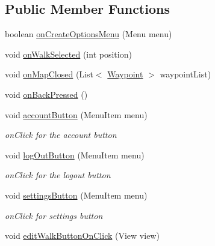 \subsection*{Public Member Functions}
\begin{DoxyCompactItemize}
\item 
boolean \hyperlink{classuk_1_1ac_1_1swan_1_1digitaltrails_1_1activities_1_1_my_walks_activity_ad0a1535fb7502d3954c565413a9d6e63}{on\+Create\+Options\+Menu} (Menu menu)
\item 
void \hyperlink{classuk_1_1ac_1_1swan_1_1digitaltrails_1_1activities_1_1_my_walks_activity_a5b28704bc8895e34d1130c06549bd003}{on\+Walk\+Selected} (int position)
\item 
void \hyperlink{classuk_1_1ac_1_1swan_1_1digitaltrails_1_1activities_1_1_my_walks_activity_a9fb92abb2b5dc3417c1008a7b98c2334}{on\+Map\+Closed} (List$<$ \hyperlink{classuk_1_1ac_1_1swan_1_1digitaltrails_1_1components_1_1_waypoint}{Waypoint} $>$ waypoint\+List)
\item 
void \hyperlink{classuk_1_1ac_1_1swan_1_1digitaltrails_1_1activities_1_1_my_walks_activity_a9b69670990169fd856b18ddb5ae6271b}{on\+Back\+Pressed} ()
\item 
void \hyperlink{classuk_1_1ac_1_1swan_1_1digitaltrails_1_1activities_1_1_my_walks_activity_ad8d0ab6b77e7ea70287732deee0e7b72}{account\+Button} (Menu\+Item menu)
\begin{DoxyCompactList}\small\item\em on\+Click for the account button \end{DoxyCompactList}\item 
void \hyperlink{classuk_1_1ac_1_1swan_1_1digitaltrails_1_1activities_1_1_my_walks_activity_a230d492de17cccefd64db8cdb0e2e951}{log\+Out\+Button} (Menu\+Item menu)
\begin{DoxyCompactList}\small\item\em on\+Click for the logout button \end{DoxyCompactList}\item 
void \hyperlink{classuk_1_1ac_1_1swan_1_1digitaltrails_1_1activities_1_1_my_walks_activity_a2de2661aae2d5adce5ac2fa3e9bd81db}{settings\+Button} (Menu\+Item menu)
\begin{DoxyCompactList}\small\item\em on\+Click for settings button \end{DoxyCompactList}\item 
void \hyperlink{classuk_1_1ac_1_1swan_1_1digitaltrails_1_1activities_1_1_my_walks_activity_ab865bd1c6818af0093804c52885e52ee}{edit\+Walk\+Button\+On\+Click} (View view)

\end{DoxyCompactItemize}
